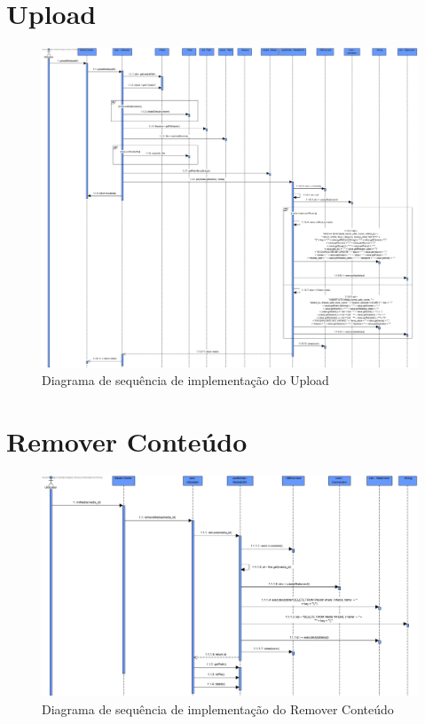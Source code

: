 \documentclass[a4paper]{report}
\begin{document}
\section{Upload}

\begin{figure}[H]
	\centering 
    \includegraphics[width=\textwidth]{images/uploadImp.png}  
    \caption{Diagrama de sequência de implementação do Upload}
\end{figure}

\section{Remover Conteúdo}

\begin{figure}[H]
	\centering 
    \includegraphics[width=\textwidth]{images/remContImp.png}  
    \caption{Diagrama de sequência de implementação do Remover Conteúdo}
\end{figure}
\end{document}
